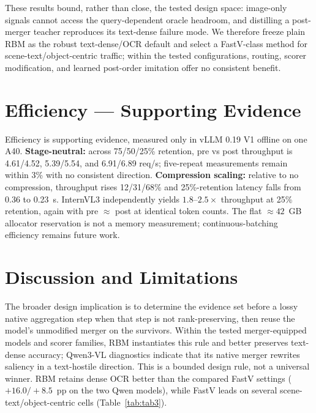 \documentclass[journal]{IEEEtran}
\begin{document}
These results bound, rather than close, the tested design space: image-only
signals cannot access the query-dependent oracle headroom, and distilling a
post-merger teacher reproduces its text-dense failure mode. We therefore freeze
plain RBM as the robust text-dense/OCR default and select a FastV-class method
for scene-text/object-centric traffic; within the tested configurations,
routing, scorer modification, and learned post-order imitation offer no
consistent benefit.

\section{Efficiency --- Supporting Evidence}\label{sec:efficiency}

Efficiency is supporting evidence, measured only in vLLM 0.19 V1 offline on one
A40. \textbf{Stage-neutral:} across 75/50/25\% retention, pre vs post throughput
is 4.61/4.52, 5.39/5.54, and 6.91/6.89 req/s; five-repeat measurements remain
within 3\% with no consistent direction. \textbf{Compression scaling:} relative
to no compression, throughput rises 12/31/68\% and 25\%-retention latency falls
from 0.36 to 0.23~s. InternVL3 independently yields $1.8$--$2.5\times$ throughput
at 25\% retention, again with pre $\approx$ post at identical token counts.
The flat $\approx42$~GB allocator reservation is not a memory measurement;
continuous-batching efficiency remains future work.

\section{Discussion and Limitations}\label{sec:discussion}

The broader design implication is to determine the evidence set before a lossy
native aggregation step when that step is not rank-preserving, then reuse the
model's unmodified merger on the survivors. Within the tested merger-equipped
models and scorer families, RBM instantiates this rule and better preserves
text-dense accuracy; Qwen3-VL diagnostics indicate that its native merger
rewrites saliency in a text-hostile direction. This is a bounded design rule,
not a universal winner. RBM retains dense OCR better
than the compared FastV settings ($+16.0/+8.5$~pp on the two Qwen models), while
FastV leads on several scene-text/object-centric cells (Table~\ref{tab:tab3}).
\end{document}
